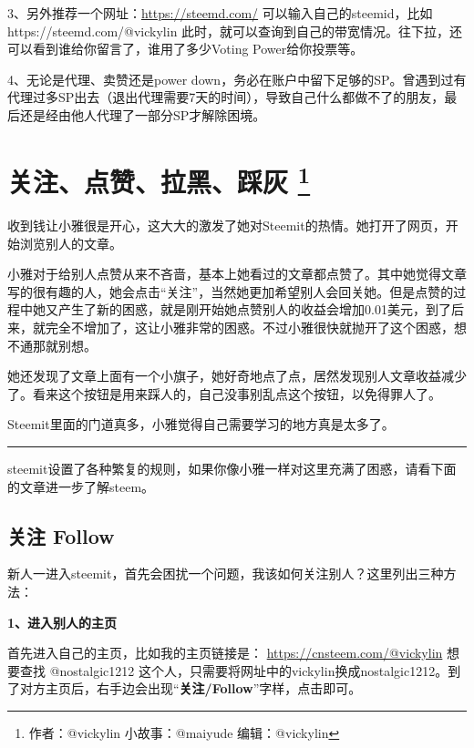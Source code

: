 \documentclass[]{ctexbook}
\begin{document}
3、另外推荐一个网址：\url{https://steemd.com/}
可以输入自己的steemid，比如https://steemd.com/@vickylin
此时，就可以查询到自己的带宽情况。往下拉，还可以看到谁给你留言了，谁用了多少Voting Power给你投票等。

4、无论是代理、卖赞还是power down，务必在账户中留下足够的SP。曾遇到过有代理过多SP出去（退出代理需要7天的时间），导致自己什么都做不了的朋友，最后还是经由他人代理了一部分SP才解除困境。

\section[关注、点赞、拉黑、踩灰 ]{\texorpdfstring{关注、点赞、拉黑、踩灰 \footnote{作者：@vickylin 小故事：@maiyude 编辑：@vickylin}}{关注、点赞、拉黑、踩灰 }}

收到钱让小雅很是开心，这大大的激发了她对Steemit的热情。她打开了网页，开始浏览别人的文章。

小雅对于给别人点赞从来不吝啬，基本上她看过的文章都点赞了。其中她觉得文章写的很有趣的人，她会点击``关注''，当然她更加希望别人会回关她。但是点赞的过程中她又产生了新的困惑，就是刚开始她点赞别人的收益会增加0.01美元，到了后来，就完全不增加了，这让小雅非常的困惑。不过小雅很快就抛开了这个困惑，想不通那就别想。

她还发现了文章上面有一个小旗子，她好奇地点了点，居然发现别人文章收益减少了。看来这个按钮是用来踩人的，自己没事别乱点这个按钮，以免得罪人了。

Steemit里面的门道真多，小雅觉得自己需要学习的地方真是太多了。

\begin{center}\rule{0.5\linewidth}{\linethickness}\end{center}

steemit设置了各种繁复的规则，如果你像小雅一样对这里充满了困惑，请看下面的文章进一步了解steem。

\hypertarget{-follow}{%
\subsection{关注 Follow}\label{-follow}}

新人一进入steemit，首先会困扰一个问题，我该如何关注别人？这里列出三种方法：

\textbf{1、进入别人的主页}

首先进入自己的主页，比如我的主页链接是：
\url{https://cnsteem.com/@vickylin}
想要查找 @nostalgic1212 这个人，只需要将网址中的vickylin换成nostalgic1212。到了对方主页后，右手边会出现``\textbf{关注/Follow}''字样，点击即可。
\end{document}
